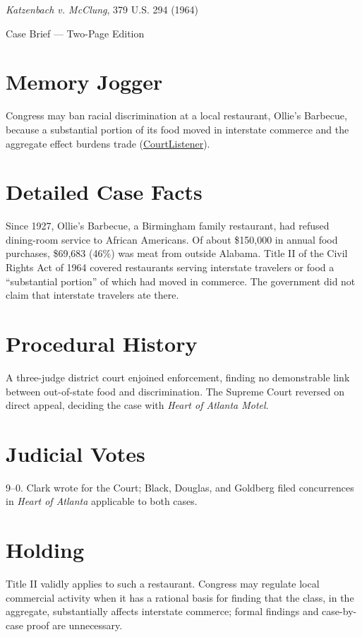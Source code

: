 \documentclass[12pt]{article}
\begin{document}
\begin{center}
{\LARGE \textit{Katzenbach v. McClung}, 379 U.S. 294 (1964)\par}
\vspace{0.5em}
{\large Case Brief --- Two-Page Edition\par}
\end{center}

\section{Memory Jogger}
Congress may ban racial discrimination at a local restaurant, Ollie's Barbecue, because a substantial portion of its food moved in interstate commerce and the aggregate effect burdens trade (\href{https://www.courtlistener.com/opinion/106951/katzenbach-v-mcclung/}{CourtListener}).

\section{Detailed Case Facts}
Since 1927, Ollie's Barbecue, a Birmingham family restaurant, had refused dining-room service to African Americans. Of about \$150,000 in annual food purchases, \$69,683 (46\%) was meat from outside Alabama. Title II of the Civil Rights Act of 1964 covered restaurants serving interstate travelers or food a ``substantial portion'' of which had moved in commerce. The government did not claim that interstate travelers ate there.

\section{Procedural History}
A three-judge district court enjoined enforcement, finding no demonstrable link between out-of-state food and discrimination. The Supreme Court reversed on direct appeal, deciding the case with \textit{Heart of Atlanta Motel}.

\section{Judicial Votes}
9--0. Clark wrote for the Court; Black, Douglas, and Goldberg filed concurrences in \textit{Heart of Atlanta} applicable to both cases.

\section{Holding}
Title II validly applies to such a restaurant. Congress may regulate local commercial activity when it has a rational basis for finding that the class, in the aggregate, substantially affects interstate commerce; formal findings and case-by-case proof are unnecessary.
\end{document}
